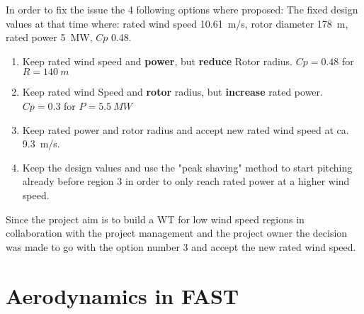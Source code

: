 In order to fix the issue the 4 following options where proposed:
The fixed design values at that time where: rated wind speed \SI{10.61}{m/s}, rotor diameter \SI{178}{m}, rated power \SI{5}{MW}, $Cp$ \SI{0.48}{}.
\begin{enumerate}
	\item Keep rated wind speed and \textbf{power}, but \textbf{reduce} Rotor radius. $Cp = 0.48$ for $R = \SI{140}{m}$
	\item Keep rated wind Speed and \textbf{rotor} radius, but \textbf{increase} rated power. $Cp = 0.3$ for $P = \SI{5.5}{MW}$
	\item Keep rated power and rotor radius and accept new rated wind speed at ca. \SI{9.3}{m/s}.
	\item Keep the design values and use the "peak shaving" method to start pitching already before region 3 in order to only reach rated power at a higher wind speed.
\end{enumerate}

Since the project aim is to build a WT for low wind speed regions in collaboration with the project management and the project owner the decision was made to go with the option number 3 and accept the new rated wind speed. 
\section{Aerodynamics in FAST}

